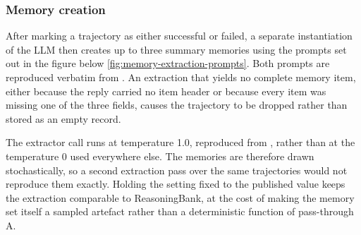 \subsubsection{Memory creation}
After marking a trajectory as either successful or failed, a separate instantiation of the LLM  then creates up to three summary memories using the prompts set out in the figure below \ref{fig:memory-extraction-prompts}. Both prompts are reproduced verbatim from \citet{ouyang2025reasoningbank}.
An extraction that yields no complete memory item, either because the reply carried no item header or because every item was missing one of the three fields, causes the trajectory to be dropped rather than stored as an empty record.

The extractor call runs at temperature 1.0, reproduced from \citet{ouyang2025reasoningbank}, rather than at the temperature 0 used everywhere else. The memories are therefore drawn stochastically, so a second extraction pass over the same trajectories would not reproduce them exactly. Holding the setting fixed to the published value keeps the extraction comparable to ReasoningBank, at the cost of making the memory set itself a sampled artefact rather than a deterministic function of pass-through A.

